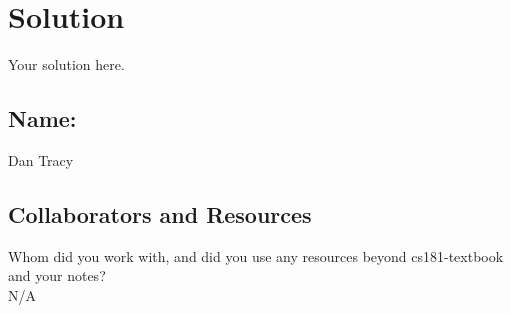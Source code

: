 \documentclass[submit]{harvardml}
\newenvironment{solution}
  {\color{blue}\section*{Solution}}
{}
\begin{document}
\newpage
\begin{solution}
	Your solution here.
\end{solution}

\newpage
\subsection*{Name:} Dan Tracy

\subsection*{Collaborators and Resources}
Whom did you work with, and did you use any resources beyond cs181-textbook and your notes? \\
N/A
\end{document}
